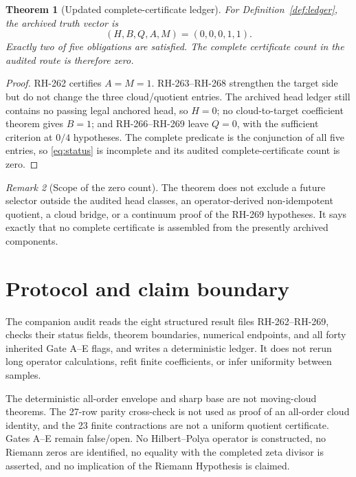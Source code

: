 \documentclass[11pt]{article}
\newtheorem{theorem}{Theorem}[section]
\theoremstyle{definition}
\theoremstyle{remark}
\newtheorem{remark}[theorem]{Remark}
\begin{document}
\begin{theorem}[Updated complete-certificate ledger]\label{thm:ledger}
For Definition~\ref{def:ledger}, the archived truth vector is
\begin{equation}
 \boxed{(H,B,Q,A,M)=(0,0,0,1,1).}
 \label{eq:status}
\end{equation}
Exactly two of five obligations are satisfied.  The complete certificate
count in the audited route is therefore zero.
\end{theorem}

\begin{proof}
RH-262 certifies $A=M=1$.  RH-263--RH-268 strengthen the target side but do
not change the three cloud/quotient entries.  The archived head ledger still
contains no passing legal anchored head, so $H=0$; no cloud-to-target
coefficient theorem gives $B=1$; and RH-266--RH-269 leave $Q=0$, with the
sufficient criterion at $0/4$ hypotheses.  The complete predicate is the
conjunction of all five entries, so \eqref{eq:status} is incomplete and its
audited complete-certificate count is zero.
\end{proof}

\begin{remark}[Scope of the zero count]
The theorem does not exclude a future selector outside the audited head
classes, an operator-derived non-idempotent quotient, a cloud bridge, or a
continuum proof of the RH-269 hypotheses.  It says exactly that no complete
certificate is assembled from the presently archived components.
\end{remark}

\section{Protocol and claim boundary}

The companion audit reads the eight structured result files RH-262--RH-269,
checks their status fields, theorem boundaries, numerical endpoints, and all
forty inherited Gate A--E flags, and writes a deterministic ledger.  It does
not rerun long operator calculations, refit finite coefficients, or infer
uniformity between samples.

The deterministic all-order envelope and sharp base are not moving-cloud
theorems.  The 27-row parity cross-check is not used as proof of an all-order
cloud identity, and the 23 finite contractions are not a uniform quotient
certificate.  Gates A--E remain false/open.  No Hilbert--Polya operator is
constructed, no Riemann zeros are identified, no equality with the completed
zeta divisor is asserted, and no implication of the Riemann Hypothesis is
claimed.



\end{document}
